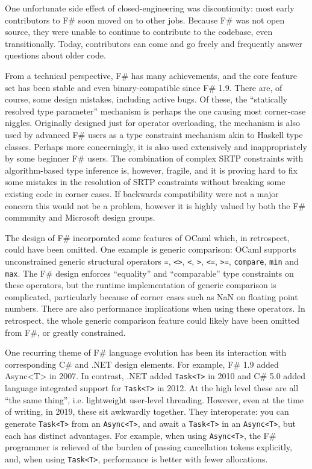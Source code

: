 \documentclass[acmsmall,review]{acmart}\settopmatter{printfolios=true,printccs=false,printacmref=false}
\begin{document}
One unfortunate side effect of closed-engineering was discontinuity: most early
contributors to F\# soon moved on to other jobs. Because F\# was not open source, they
were unable to continue to contribute to the codebase, even transitionally. Today, contributors
can come and go freely and frequently answer questions about older code.

From a technical perspective, F\# has many achievements, and the core feature set has
been stable and even binary-compatible since F\# 1.9.  There are, of course, some
design mistakes, including active bugs.  Of these, the “statically resolved type parameter”
mechanism is perhaps the one causing most corner-case niggles. Originally designed just for
operator overloading, the mechanism is also used by advanced F\# users as a type constraint
mechanism akin to Haskell type classes. Perhaps more concerningly, it is also used extensively
and inappropriately by some beginner F\# users.   The combination of complex SRTP constraints
with algorithm-based type inference is, however, fragile, and it is proving hard to fix some
mistakes in the resolution of SRTP constraints without breaking some existing code in
corner cases.  If backwards compatibility were not a major concern this would not be
a problem, however it is highly valued by both the F\# community and Microsoft design groups.

The design of F\# incorporated some features of OCaml which, in retrospect, could have
been omitted.  One example is generic comparison: OCaml supports unconstrained generic
structural operators \texttt{=}, \texttt{<>}, \texttt{<}, \texttt{>}, \texttt{<=}, \texttt{>=}, \texttt{compare}, \texttt{min} and \texttt{max}.
The F\# design enforces “equality” and “comparable” type constraints on these operators, but the runtime
implementation of generic comparison is complicated, particularly because of corner cases
such as NaN on floating point numbers. There are also performance implications when
using these operators. In retrospect, the whole generic comparison feature could likely
have been omitted from F\#, or greatly constrained.

One recurring theme of F\# language evolution has been its interaction with corresponding
C\# and .NET design elements.  For example, F\# 1.9 added Async<T> in 2007.  In
contrast, .NET added \texttt{Task<T>} in 2010 and C\# 5.0 added language integrated support for \texttt{Task<T>} in
2012.  At the high level these are all “the same thing”, i.e. lightweight user-level threading. However,
even at the time of writing, in 2019, these sit awkwardly together. They interoperate:
you can generate \texttt{Task<T>} from an \texttt{Async<T>}, and await a \texttt{Task<T>} in an \texttt{Async<T>}, but
each has distinct advantages. For example, when using \texttt{Async<T>}, the F\# programmer is relieved of the burden of
passing cancellation tokens explicitly, and, when using \texttt{Task<T>}, performance is better with fewer allocations.  
\end{document}
